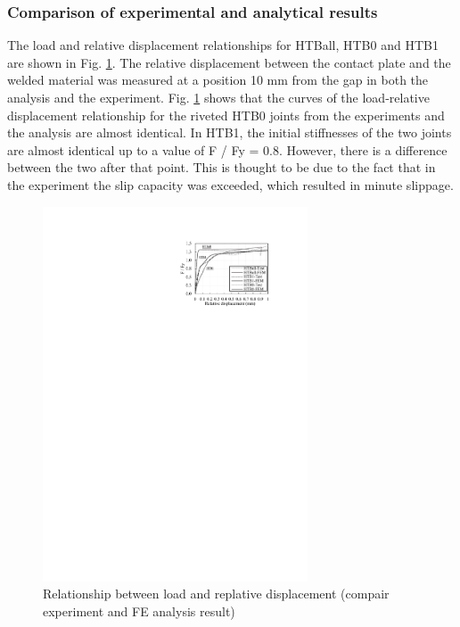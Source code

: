 \subsubsection{Comparison of experimental and analytical results}

The load and relative displacement relationships for HTBall, HTB0 and HTB1 are shown in Fig. \ref{ch4figA3}. The relative displacement between the contact plate and the welded material was measured at a position 10 mm from the gap in both the analysis and the experiment.
Fig. \ref{ch4figA3} shows that the curves of the load-relative displacement relationship for the riveted HTB0 joints from the experiments and the analysis are almost identical. In HTB1, the initial stiffnesses of the two joints are almost identical up to a value of F / Fy = 0.8. However, there is a difference between the two after that point. This is thought to be due to the fact that in the experiment the slip capacity was exceeded, which resulted in minute slippage.

\begin{figure}[htbp]
    \centering
    \includegraphics[width=0.7\textwidth]{imgs/ch4/figA3.pdf}
    \caption{Relationship between load and replative displacement (compair experiment and FE analysis result)}
    \label{ch4figA3}
\end{figure}

